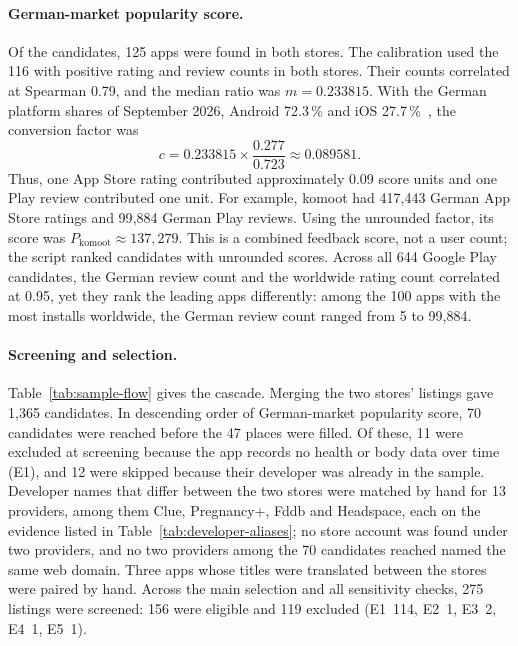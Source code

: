 \paragraph{German-market popularity score.} Of the candidates, 125 apps were
found in both stores. The calibration used the 116 with positive rating and
review counts in both stores. Their counts correlated at Spearman 0.79, and
the median ratio was $m = 0.233815$. With the German platform shares of
September 2026, Android 72.3\,\% and iOS
27.7\,\%~\parencite{statcounter2026os}, the conversion factor was
\[
  c = 0.233815\times\frac{0.277}{0.723}\approx 0.089581.
\]
Thus, one App Store rating contributed approximately 0.09 score units and one
Play review contributed one unit. For example, komoot had 417{,}443 German App
Store ratings and 99{,}884 German Play reviews. Using the unrounded factor,
its score was $P_{\mathrm{komoot}}\approx137{,}279$. This is a combined feedback
score, not a user count; the script ranked candidates with unrounded scores.
Across all 644 Google Play candidates, the German review count and the
worldwide rating count correlated at 0.95, yet they rank the leading apps
differently: among the 100 apps with the most installs worldwide, the German
review count ranged from 5 to 99{,}884.

\paragraph{Screening and selection.} Table~\ref{tab:sample-flow} gives the
cascade. Merging the two stores' listings gave 1{,}365 candidates. In descending
order of German-market popularity score, 70 candidates were reached before
the 47 places were filled.
Of these, 11 were excluded at screening because the app records no health or
body data over time (E1), and 12 were skipped because their developer was
already in the sample. Developer names that differ between the two stores were
matched by hand for 13 providers, among them Clue, Pregnancy+, Fddb and
Headspace, each on the evidence listed in Table~\ref{tab:developer-aliases};
no store account was found under two providers, and no two providers among the
70 candidates reached named the same web domain. Three apps whose titles were
translated between the stores were paired by hand. Across the main selection and all sensitivity checks, 275
listings were screened: 156 were eligible and 119 excluded (E1~114, E2~1,
E3~2, E4~1, E5~1).


